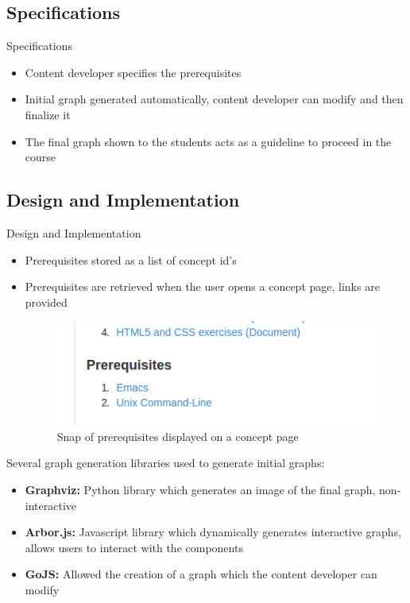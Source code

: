 \documentclass{beamer}
\begin{document}
\subsection{Specifications}

\begin{frame}{Specifications}
	\begin{itemize}
		\item Content developer specifies the prerequisites
		\item Initial graph generated automatically, content developer can modify and then finalize it
		\item The final graph shown to the students acts as a guideline to proceed in the course
	\end{itemize}
\end{frame}

\subsection{Design and Implementation}

\begin{frame}{Design and Implementation}
	\begin{itemize}
		\item Prerequisites stored as a list of concept id's
		\item Prerequisites are retrieved when the user opens a concept page, links are provided
		\begin{figure}
			\centering
			\includegraphics[width=0.8\linewidth]{media/PrereqList}
			\caption{Snap of prerequisites displayed on a concept page}
			\label{fig:PrereqList}
		\end{figure}
	\end{itemize}
\end{frame}

\begin{frame}
	Several graph generation libraries used to generate initial graphs:
	\begin{itemize}
		\item \textbf{Graphviz:} Python library which generates an image of the final graph, non-interactive
		\item \textbf{Arbor.js:} Javascript library which dynamically generates interactive graphs, allows users to interact with the components
		\item \textbf{GoJS:} Allowed the creation of a graph which the content developer can modify
	\end{itemize}
\end{frame}
\end{document}
